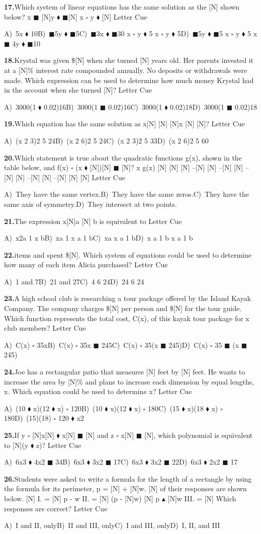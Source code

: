 \documentclass[10pt]{article}
\newcommand{\opA}{\ensuremath{\square}}
\newcommand{\opB}{\ensuremath{\blacksquare}}
\newcommand{\opC}{\ensuremath{\blacklozenge}}
\newcommand{\opE}{\ensuremath{\blacktriangle}}
\newcommand{\Q}[6]{%
  \par\vspace{0.38em}%
  \noindent\textbf{#1.}\enspace #2\hfill
  Letter \underline{\hspace{1.05em}}\enspace Cue \underline{\hspace{1.8em}}\par
  \nobreak
  {\small\noindent A)\ #3\quad B)\ #4\quad C)\ #5\quad D)\ #6\par}%
}
\begin{document}
\Q{17}{Which system of linear equations has the same solution as the [N] shown below? x \opB{} [N]y \opC{} \opB{}[N] x \opA{} y \opC{} [N]}{5x \opC{} 10}{\opB{}5y \opC{} \opB{}5}{\opB{}3x \opC{} \opB{}30 x \opA{} y \opC{} 5 x \opA{} y \opC{} 5}{\opB{}5y \opC{} \opB{}5 x \opA{} y \opC{} 5 x \opB{} 4y \opC{} \opB{}10}
\Q{18}{Krystal was given \$[N] when she turned [N] years old. Her parents invested it at a [N]\% interest rate compounded annually. No deposits or withdrawals were made. Which expression can be used to determine how much money Krystal had in the account when she turned [N]?}{3000(1 \opC{} 0.02)16}{3000(1 \opB{} 0.02)16}{3000(1 \opC{} 0.02)18}{3000(1 \opB{} 0.02)18}
\Q{19}{Which equation has the same solution as x[N] [N] [N]x [N] [N]?}{(x 2 3)2 5 24}{(x 2 6)2 5 24}{(x 2 3)2 5 33}{(x 2 6)2 5 60}
\Q{20}{Which statement is true about the quadratic functions g(x), shown in the table below, and f(x) \opA{} (x \opC{} [N])[N] \opB{} [N]? x g(x) [N] [N] [N] --[N] [N] --[N] [N] --[N] [N] --[N] [N] --[N] [N] [N]}{They have the same vertex.}{They have the same zeros.}{They have the same axis of symmetry.}{They intersect at two points.}
\Q{21}{The expression x[N]a [N] b is equivalent to}{x2a 1 x b}{xa 1 x a 1 b}{xa \textbullet{} x a 1 b}{x a 1 b \textbullet{} x a 1 b}
\Q{22}{items and spent \$[N]. Which system of equations could be used to determine how many of each item Alicia purchased?}{1 and 7}{21 and 27}{4 6 24}{24 6 24}
\Q{23}{A high school club is researching a tour package offered by the Island Kayak Company. The company charges \$[N] per person and \$[N] for the tour guide. Which function represents the total cost, C(x), of this kayak tour package for x club members?}{C(x) \opA{} 35x}{C(x) \opA{} 35x \opB{} 245}{C(x) \opA{} 35(x \opB{} 245)}{C(x) \opA{} 35 \opB{} (x \opB{} 245)}
\Q{24}{Joe has a rectangular patio that measures [N] feet by [N] feet. He wants to increase the area by [N]\% and plans to increase each dimension by equal lengths, x. Which equation could be used to determine x?}{(10 \opC{} x)(12 \opC{} x) \opA{} 120}{(10 \opC{} x)(12 \opC{} x) \opA{} 180}{(15 \opC{} x)(18 \opC{} x) \opA{} 180}{(15)(18) \opA{} 120 \opC{} x2}
\Q{25}{If y \opA{} [N]x[N] \opC{} x[N] \opB{} [N] and z \opA{} x[N] \opB{} [N], which polynomial is equivalent to [N](y \opC{} z)?}{6x3 \opC{} 4x2 \opB{} 34}{6x3 \opC{} 3x2 \opB{} 17}{6x3 \opC{} 3x2 \opB{} 22}{6x3 \opC{} 2x2 \opB{} 17}
\Q{26}{Students were asked to write a formula for the length of a rectangle by using the formula for its perimeter, p = [N] + [N]w. [N] of their responses are shown below. [N] I. = [N] p - w II. = [N] (p - [N]w) [N] p \opE{} [N]w III. = [N] Which responses are correct?}{I and II, only}{II and III, only}{I and III, only}{I, II, and III}
\end{document}
